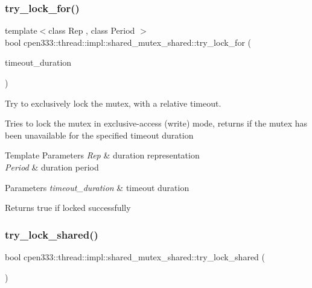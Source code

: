 \subsubsection{\texorpdfstring{try\+\_\+lock\+\_\+for()}{try\_lock\_for()}}
{\footnotesize\ttfamily template$<$class Rep , class Period $>$ \\
bool cpen333\+::thread\+::impl\+::shared\+\_\+mutex\+\_\+shared\+::try\+\_\+lock\+\_\+for (\begin{DoxyParamCaption}\item[{const std\+::chrono\+::duration$<$ Rep, Period $>$ \&}]{timeout\+\_\+duration }\end{DoxyParamCaption})\hspace{0.3cm}{\ttfamily [inline]}}



Try to exclusively lock the mutex, with a relative timeout. 

Tries to lock the mutex in exclusive-\/access (write) mode, returns if the mutex has been unavailable for the specified timeout duration


\begin{DoxyTemplParams}{Template Parameters}
{\em Rep} & duration representation \\
\hline
{\em Period} & duration period \\
\hline
\end{DoxyTemplParams}

\begin{DoxyParams}{Parameters}
{\em timeout\+\_\+duration} & timeout duration \\
\hline
\end{DoxyParams}
\begin{DoxyReturn}{Returns}
true if locked successfully 
\end{DoxyReturn}
\mbox{\label{classcpen333_1_1thread_1_1impl_1_1shared__mutex__shared_a147d8ab59cf14fd567135542c2302c4f}} 
\subsubsection{\texorpdfstring{try\+\_\+lock\+\_\+shared()}{try\_lock\_shared()}}
{\footnotesize\ttfamily bool cpen333\+::thread\+::impl\+::shared\+\_\+mutex\+\_\+shared\+::try\+\_\+lock\+\_\+shared (\begin{DoxyParamCaption}{ }\end{DoxyParamCaption})\hspace{0.3cm}{\ttfamily [inline]}}



